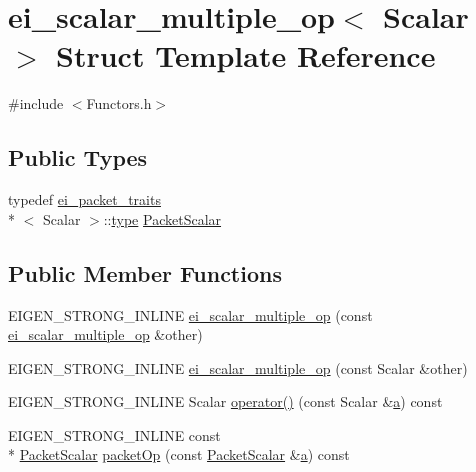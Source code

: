 \hypertarget{structei__scalar__multiple__op}{\section{ei\-\_\-scalar\-\_\-multiple\-\_\-op$<$ Scalar $>$ Struct Template Reference}
\label{structei__scalar__multiple__op}
}


{\ttfamily \#include $<$Functors.\-h$>$}

\subsection*{Public Types}
\begin{DoxyCompactItemize}
\item 
typedef \hyperlink{structei__packet__traits}{ei\-\_\-packet\-\_\-traits}\\*
$<$ Scalar $>$\-::\hyperlink{glext_8h_a7d05960f4f1c1b11f3177dc963a45d86}{type} \hyperlink{structei__scalar__multiple__op_ab5a0b096d168a95f9972d26439c15488}{Packet\-Scalar}
\end{DoxyCompactItemize}
\subsection*{Public Member Functions}
\begin{DoxyCompactItemize}
\item 
E\-I\-G\-E\-N\-\_\-\-S\-T\-R\-O\-N\-G\-\_\-\-I\-N\-L\-I\-N\-E \hyperlink{structei__scalar__multiple__op_a01b9a5382fe44250fc502af1f8699d3f}{ei\-\_\-scalar\-\_\-multiple\-\_\-op} (const \hyperlink{structei__scalar__multiple__op}{ei\-\_\-scalar\-\_\-multiple\-\_\-op} \&other)
\item 
E\-I\-G\-E\-N\-\_\-\-S\-T\-R\-O\-N\-G\-\_\-\-I\-N\-L\-I\-N\-E \hyperlink{structei__scalar__multiple__op_a3c6bc094eb4f0cd678fde57892c0d478}{ei\-\_\-scalar\-\_\-multiple\-\_\-op} (const Scalar \&other)
\item 
E\-I\-G\-E\-N\-\_\-\-S\-T\-R\-O\-N\-G\-\_\-\-I\-N\-L\-I\-N\-E Scalar \hyperlink{structei__scalar__multiple__op_ab694343ae174b06a0b9bf438036b27c5}{operator()} (const Scalar \&\hyperlink{glext_8h_ac8729153468b5dcf13f971b21d84d4e5}{a}) const 
\item 
E\-I\-G\-E\-N\-\_\-\-S\-T\-R\-O\-N\-G\-\_\-\-I\-N\-L\-I\-N\-E const \\*
\hyperlink{structei__scalar__multiple__op_ab5a0b096d168a95f9972d26439c15488}{Packet\-Scalar} \hyperlink{structei__scalar__multiple__op_a55093847b781c039a83492b51741bb2d}{packet\-Op} (const \hyperlink{structei__scalar__multiple__op_ab5a0b096d168a95f9972d26439c15488}{Packet\-Scalar} \&\hyperlink{glext_8h_ac8729153468b5dcf13f971b21d84d4e5}{a}) const 
\end{DoxyCompactItemize}
